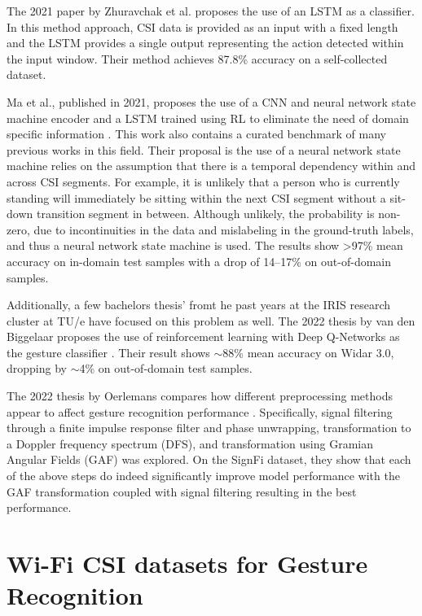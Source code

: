 The 2021 paper by Zhuravchak et al. proposes the use of an LSTM as a classifier. 
In this method approach, CSI data is provided as an input with a fixed length and the LSTM provides a single output representing the action detected within the input window.
Their method achieves 87.8\% accuracy on a self-collected dataset.

Ma et al., published in 2021, proposes the use of a CNN and neural network state machine encoder and a LSTM trained using RL to eliminate the need of domain specific information \cite{ma2021location}.
This work also contains a curated benchmark of many previous works in this field.
Their proposal is the use of a neural network state machine relies on the assumption that there is a temporal dependency within and across CSI segments.
For example, it is unlikely that a person who is currently standing will immediately be sitting within the next CSI segment without a sit-down transition segment in between.
Although unlikely, the probability is non-zero, due to incontinuities in the data and mislabeling in the ground-truth labels, and thus a neural network state machine is used.
The results show >97\% mean accuracy on in-domain test samples with a drop of 14--17\% on out-of-domain samples.

Additionally, a few bachelors thesis' fromt he past years at the IRIS research cluster at TU/e have focused on this problem as well.
The 2022 thesis by van den Biggelaar proposes the use of reinforcement learning with Deep Q-Networks as the gesture classifier \cite{biggelaar2022gesture}.
Their result shows $\sim$88\% mean accuracy on Widar 3.0, dropping by $\sim$4\% on out-of-domain test samples.

The 2022 thesis by Oerlemans compares how different preprocessing methods appear to affect gesture recognition performance \cite{oerlemans2022effect}.
Specifically, signal filtering through a finite impulse response filter and phase unwrapping, transformation to a Doppler frequency spectrum (DFS), and transformation using Gramian Angular Fields (GAF) was explored.
On the SignFi dataset, they show that each of the above steps do indeed significantly improve model performance with the GAF transformation coupled with signal filtering resulting in the best performance.

\section{Wi-Fi CSI datasets for Gesture Recognition}

